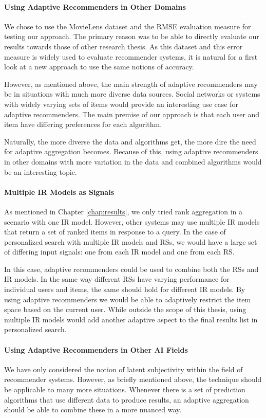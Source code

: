 \paragraph{Using Adaptive Recommenders in Other Domains}
We chose to use the MovieLens dataset and the RMSE evaluation measure for testing our approach.
The primary reason was to be able to directly evaluate our results towards those of other research thesis.
As this dataset and this error measure is widely used to evaluate recommender systems,
it is natural for a first look at a new approach to use the same notions of accuracy.

However, as mentioned above, the main strength of adaptive recommenders may be
in situations with much more diverse data sources. Social networks or systems
with widely varying sets of items would provide an interesting use case for adaptive recommenders.
The main premise of our approach is that each user and item have differing preferences
for each algorithm. 

Naturally, the more diverse the data and algorithms get,
the more dire the need for adaptive aggregation becomes.
Because of this, using adaptive recommenders in other domains with more variation 
in the data and combined algorithms would be an interesting topic.


\paragraph{Multiple IR Models as Signals}
As mentioned in Chapter \ref{chap:results},
we only tried rank aggregation in a scenario with one IR model.
However, other systems may use multiple IR models
that return a set of ranked items in response to a query.
In the case of personalized search with multiple IR models
and RSs, we would have a large set of differing
input signals:
one from each IR model and one from each RS.

In this case, adaptive recommenders could be used to combine
both the RSs and IR models.
In the same way different RSs have varying performance
for individual users and items, the same should hold
for different IR models.
By using adaptive recommenders we would be able
to adaptively restrict the item space based on the 
current user.
While outside the scope of this thesis,
using multiple IR models would add another adaptive
aspect to the final results list in personalized search.


\paragraph{Using Adaptive Recommenders in Other AI Fields}
We have only considered the notion of latent subjectivity within the field of recommender systems.
However, as briefly mentioned above, the technique should be applicable to many more situations.
Whenever there is a set of prediction algorithms that use different data to produce results,
an adaptive aggregation should be able to combine these in a more nuanced way.

